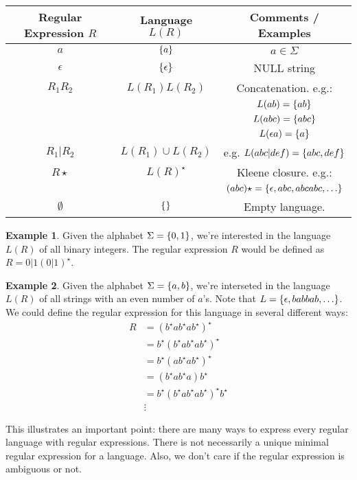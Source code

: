 \documentclass[]{article}
\DeclarePairedDelimiter{\set}{\lbrace}{\rbrace}
\theoremstyle{definition}
\newtheorem{ex}{Example}[section]
\begin{document}
			\begin{center}
				\begin{tabular}{c|c|c}
					Regular Expression $R$ & Language $L(R)$ & Comments / Examples \\ \hline
					$a$ & $\set{a}$ & $a \in \Sigma$ \\
					$\epsilon$ & $\set{\epsilon}$ &  NULL string \\
					$R_1 R_2$ & $L(R_1) L(R_2)$ & Concatenation. e.g.:  \\
					& & $L(ab) = \set{ab}$ \\
					& & $L(abc) = \set{abc}$ \\
					& & $L(\epsilon a) = \set{a}$ \\
					$R_1 | R_2$ & $L(R_1) \cup L(R_2)$ & e.g. $L(abc | def) = \set{abc, def}$ \\
					$R \star$ & $L(R)^\star$ & Kleene closure. e.g.: \\
					& & $(abc) \star = \set{\epsilon, abc, abcabc, \ldots}$ \\
					$\emptyset$ & $\set{}$ & Empty language.
				\end{tabular}
			\end{center}

			\begin{ex}
				Given the alphabet $\Sigma = \set{0, 1}$, we're interested in the language $L(R)$ of all binary integers. The regular expression $R$ would be defined as $R = 0 | 1(0 | 1)^\star$.
			\end{ex}

			\begin{ex}
				Given the alphabet $\Sigma = \set{a, b}$, we're interseted in the language $L(R)$ of all strings with an even number of $a$'s. Note that $L = \set{\epsilon, babbab, \ldots}$. We could define the regular expression for this language in several different ways:
				\begin{align*}
					R &= (b^\star{} ab^\star{} ab^\star{})^\star \\
					&= b^\star{}(b^\star{}ab^\star{}ab^\star{})^\star \\
					&= b^\star{}(ab^\star{}ab^\star{})^\star \\
					&= (b^\star{}ab^\star{}a)b^\star \\
					&= b^\star{}(b^\star{}ab^\star{}ab^\star{})^\star{} b^\star \\
					&\vdots
				\end{align*}

				This illustrates an important point: there are many ways to express every regular language with regular expressions. There is not necessarily a unique minimal regular expression for a language. Also, we don't care if the regular expression is ambiguous or not.
			\end{ex}
			
\end{document}

